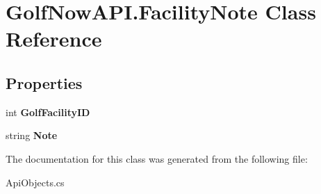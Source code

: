 \hypertarget{class_golf_now_a_p_i_1_1_facility_note}{}\section{Golf\+Now\+A\+P\+I.\+Facility\+Note Class Reference}
\label{class_golf_now_a_p_i_1_1_facility_note}
\subsection*{Properties}
\begin{DoxyCompactItemize}
\item 
\mbox{\label{class_golf_now_a_p_i_1_1_facility_note_adff84c8caf11846148d58645384d7389}} 
int {\bfseries Golf\+Facility\+ID}
\item 
\mbox{\label{class_golf_now_a_p_i_1_1_facility_note_aaea072fc2acb619fc3f83111fa2271bc}} 
string {\bfseries Note}
\end{DoxyCompactItemize}


The documentation for this class was generated from the following file\+:\begin{DoxyCompactItemize}
\item 
Api\+Objects.\+cs\end{DoxyCompactItemize}
